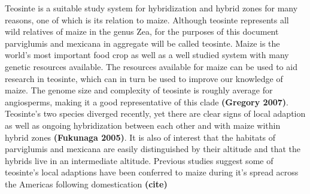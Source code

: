 \documentclass[12pt]{amsart}
\newcommand{\mbh}[1]{\textcolor{red}{ \emph{\scriptsize  #1}} }
\begin{document}
Teosinte is a suitable study system for hybridization and hybrid zones for many reasons, one of which is its relation to maize.  
Although teosinte represents all wild relatives of maize in the genus {Zea}, for the purposes of this document parviglumis and mexicana in aggregate will be called teosinte. 
Maize is the world's most important food crop as well as a well studied system with many genetic resources available.
The resources available for maize can be used to aid research in teosinte, which can in turn be used to improve our knowledge of maize.
The genome size and complexity of teosinte is roughly average for angiosperms, making it a good representative of this clade \textbf{(Gregory 2007)}. 
Teosinte's two species diverged recently, yet there are clear signs of local adaption as well as ongoing hybridization between each other and with maize within hybrid zones \textbf{(Fukunaga 2005)}.
It is also of interest that the habitats of parviglumis and mexicana are easily distinguished by their altitude and that the hybrids live in an intermediate altitude.
Previous studies suggest some of teosinte's local adaptions have been conferred to maize during it's spread across the Americas following domestication \textbf{(cite)} %
\end{document}
